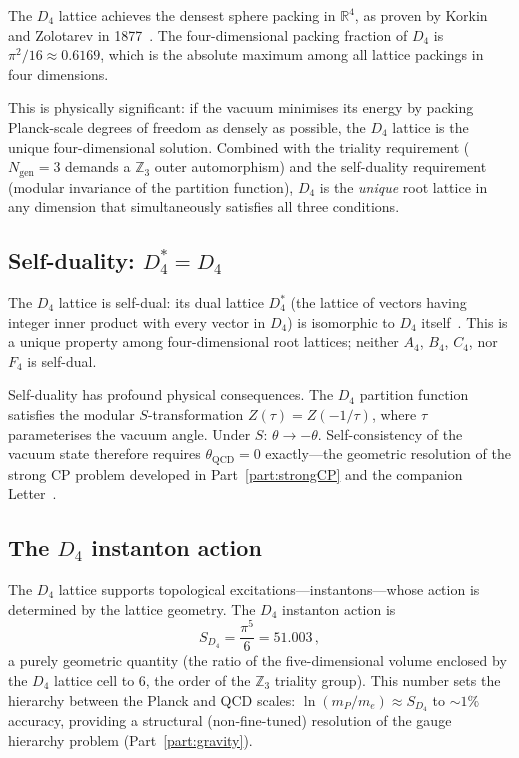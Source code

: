 \documentclass[review,number,sort&compress]{elsarticle}
\newcommand{\SD}{S_{D_4}}
\newcommand{\Dfour}{D_4}
\begin{document}
The $\Dfour$ lattice achieves the densest sphere packing in
$\mathbb{R}^4$, as proven by Korkin and Zolotarev in
1877~\cite{KorkinZolotarev}. The four-dimensional packing fraction of
$\Dfour$ is $\pi^2/16 \approx 0.6169$, which is the absolute maximum
among all lattice packings in four dimensions.

This is physically significant: if the vacuum minimises its energy by
packing Planck-scale degrees of freedom as densely as possible, the
$\Dfour$ lattice is the unique four-dimensional solution. Combined with
the triality requirement ($N_{\mathrm{gen}} = 3$ demands a $\mathbb{Z}_3$
outer automorphism) and the self-duality requirement (modular invariance
of the partition function), $\Dfour$ is the \textit{unique} root lattice
in any dimension that simultaneously satisfies all three conditions.

\subsection{Self-duality: $D_4^* = D_4$}

The $\Dfour$ lattice is self-dual: its dual lattice $D_4^*$ (the lattice
of vectors having integer inner product with every vector in $\Dfour$)
is isomorphic to $\Dfour$ itself~\cite{ConwaySloane}. This is a unique
property among four-dimensional root lattices; neither $A_4$, $B_4$,
$C_4$, nor $F_4$ is self-dual.

Self-duality has profound physical consequences. The $\Dfour$ partition
function satisfies the modular $S$-transformation
$Z(\tau) = Z(-1/\tau)$, where $\tau$ parameterises the vacuum angle.
Under $S$: $\theta \to -\theta$. Self-consistency of the vacuum state
therefore requires $\theta_{\mathrm{QCD}} = 0$ exactly---the geometric
resolution of the strong CP problem developed in
Part~\ref{part:strongCP} and the companion Letter~\cite{BCTstrongCP}.

\subsection{The $\Dfour$ instanton action}

The $\Dfour$ lattice supports topological excitations---instantons---whose
action is determined by the lattice geometry. The $\Dfour$ instanton action
is
\begin{equation}
  \SD = \frac{\pi^5}{6} = 51.003\,,
  \label{eq:SD4}
\end{equation}
a purely geometric quantity (the ratio of the five-dimensional volume
enclosed by the $\Dfour$ lattice cell to $6$, the order of the
$\mathbb{Z}_3$ triality group). This number sets the hierarchy between
the Planck and QCD scales: $\ln(m_P/m_e) \approx \SD$ to $\sim 1\%$
accuracy, providing a structural (non-fine-tuned) resolution of the gauge
hierarchy problem (Part~\ref{part:gravity}).
\end{document}
